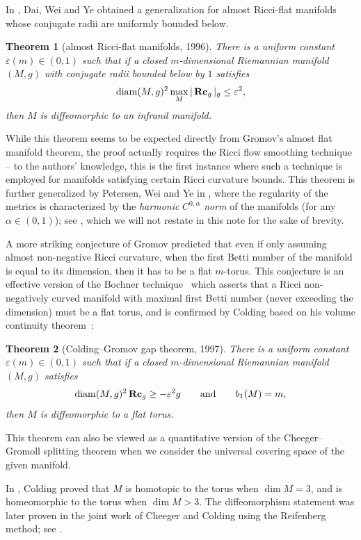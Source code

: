 \documentclass[10pt,a4paper]{amsart}
\numberwithin{equation}{section}
\newtheorem{Theorem}{Theorem}[section]
\DeclareMathOperator{\diam}{diam}
\newcommand{\Rc}{\operatorname{\bf Rc}}
\begin{document}
In \cite{DWY96}, Dai, Wei and Ye obtained a generalization for almost Ricci-flat
manifolds whose conjugate radii are uniformly bounded below.
 \begin{Theorem}[almost Ricci-flat manifolds, 1996] \label{thm: DWY96}
 There is a uniform constant $\varepsilon(m)\in (0,1)$ such that if a closed
 $m$-dimensional Riemannian manifold $(M,g)$ with conjugate radii bounded below
 by $1$ satisfies
\begin{align*}
 \diam(M,g)^2\max_M |\Rc_g |_g \le \varepsilon^2,
\end{align*}
then $M$ is diffeomorphic to an infranil manifold.
\end{Theorem}
While this theorem seems to be expected directly from Gromov's almost flat
manifold theorem, the proof actually requires the Ricci flow smoothing technique
-- to the authors' knowledge, this is the first instance where such a technique
is employed for manifolds satisfying certain Ricci curvature bounds. This
theorem is further generalized by Petersen, Wei and Ye in \cite{PWY99}, where
the regularity of the metrics is characterized by the \emph{harmonic}
$C^{0,\alpha}$ \emph{norm} of the manifolds (for any $\alpha\in (0,1)$); see
\cite[Theorem~1.4]{PWY99}, which we will not restate in this note for the sake
of brevity.

A more striking conjecture of Gromov \cite{GLP} predicted that
even if only assuming almost non-negative Ricci curvature, when the first Betti
number of the manifold is equal to its dimension, then it has to be a flat
$m$-torus. This conjecture is an effective version of the Bochner technique~\cite{Bochner, BY} which asserts that a Ricci non-negatively curved manifold
with maximal first Betti number (never exceeding the dimension) must be a flat
torus, and is confirmed by Colding based on his volume continuity theorem~\cite{Colding97}:
\begin{Theorem}[Colding--Gromov gap theorem, 1997]\label{thm: CG97}
There is a uniform constant $\varepsilon(m)\in (0,1)$ such that if a closed
$m$-dimensional Riemannian manifold $(M,g)$ satisfies
\begin{align*}
\diam(M,g)^2\Rc_g \ge -\varepsilon^2 g\qquad \text{and}\qquad b_1(M) = m,
\end{align*}
then $M$ is diffeomorphic to a flat torus.
\end{Theorem}
This theorem can also be viewed as a quantitative version of the Cheeger--Gromoll
splitting theorem \cite{CG71} when we consider the universal covering space of
the given manifold.
\begin{Remark}
In \cite{Colding97}, Colding proved that $M$ is homotopic to the torus when
$\dim M=3$, and is homeomorphic to the torus when $\dim M>3$. The diffeomorphism
statement was later proven in the joint work of Cheeger and Colding using the
Reifenberg method; see \cite[Appendix~A]{ChCoI}.
\end{Remark}
\end{document}
